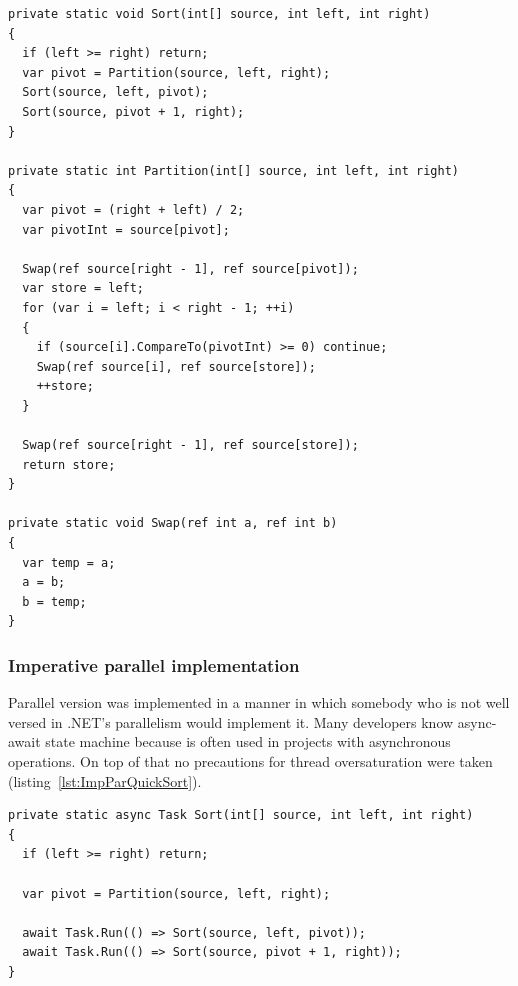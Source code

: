 \begin{lstlisting}[language={[sharp]c}, style=sharpcstyle, caption={Imperative sequential \texttt{quicksort} implementation}, label={lst:ImpSeqQuickSort},
numbers=none, xleftmargin=0pt,framexleftmargin=0pt,framexrightmargin=0pt,framexbottommargin=0pt]
private static void Sort(int[] source, int left, int right)
{
  if (left >= right) return;
  var pivot = Partition(source, left, right);
  Sort(source, left, pivot);
  Sort(source, pivot + 1, right);
}

private static int Partition(int[] source, int left, int right)
{
  var pivot = (right + left) / 2;
  var pivotInt = source[pivot];

  Swap(ref source[right - 1], ref source[pivot]);
  var store = left;
  for (var i = left; i < right - 1; ++i)
  {
    if (source[i].CompareTo(pivotInt) >= 0) continue;
    Swap(ref source[i], ref source[store]);
    ++store;
  }

  Swap(ref source[right - 1], ref source[store]);
  return store;
}

private static void Swap(ref int a, ref int b)
{
  var temp = a;
  a = b;
  b = temp;
}
\end{lstlisting}

\subsubsection{Imperative parallel implementation}
Parallel version was implemented in a manner in which somebody who is not well versed in .NET's parallelism would implement it. Many developers know async-await state machine because is often used in projects with asynchronous operations. On top of that no precautions for thread oversaturation were taken (listing~\ref{lst:ImpParQuickSort}).
\begin{lstlisting}[language={[sharp]c}, style=sharpcstyle, caption={Imperative parallel \texttt{quicksort}}, label={lst:ImpParQuickSort},
numbers=none, xleftmargin=0pt,framexleftmargin=0pt,framexrightmargin=0pt,framexbottommargin=0pt]
private static async Task Sort(int[] source, int left, int right)
{
  if (left >= right) return;

  var pivot = Partition(source, left, right);

  await Task.Run(() => Sort(source, left, pivot));
  await Task.Run(() => Sort(source, pivot + 1, right));
}
\end{lstlisting}

